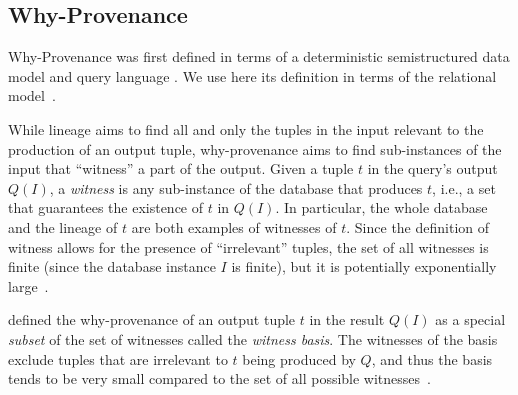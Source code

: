 \documentclass[preprint,12pt,sort&compress]{elsarticle}
\newtheorem{definition}{Definition}[section]
\begin{document}
\subsection{Why-Provenance}
Why-Provenance was first defined in terms of a deterministic semistructured data model and query language \citep{WhyProvBuneman}.  We use here its definition in terms of the relational model~\citep{CheneyProvSurvey}.

While lineage aims to find all and only the tuples in the input relevant to the production of an output tuple, why-provenance aims to find sub-instances of the input that ``witness'' a part of the output. 
Given a tuple $t$ in the query's output $Q(I)$, a \emph{witness} is any sub-instance of the database that produces $t$, i.e., a set that guarantees the existence of $t$ in $Q(I)$.
In particular, the whole database and the lineage of $t$ are both examples of witnesses of $t$.
Since the definition of witness allows for the presence of ``irrelevant'' tuples, the set of all witnesses is finite (since the database instance $I$ is finite), but it is potentially exponentially large~\citep{CheneyProvSurvey}.

\citet{WhyProvBuneman} defined the why-provenance of an output tuple $t$ in the result $Q(I)$ as a special \emph{subset} of the set of witnesses called the \emph{witness basis}.
The witnesses of the basis exclude tuples that are irrelevant to $t$ being produced by $Q$, and thus the basis tends to be very small compared to the set of all possible witnesses~\citep{CheneyProvSurvey}.


\end{document}
